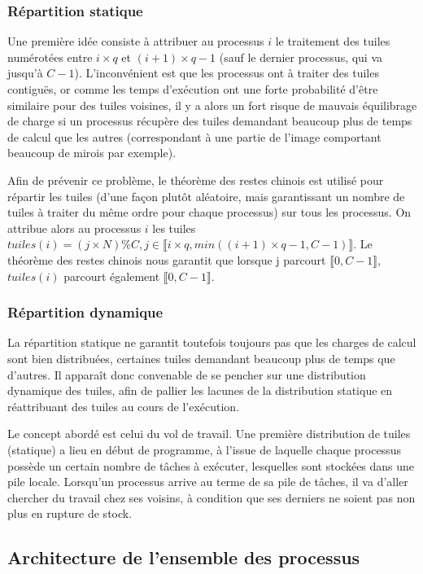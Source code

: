 \subsubsection*{Répartition statique}

Une première idée consiste à attribuer au processus $i$ le traitement des tuiles numérotées entre $i\times q$ et $(i+1)\times q - 1$ (sauf le dernier processus, qui va jusqu'à $C-1$). L'inconvénient est que les processus ont à traiter des tuiles contiguës, or comme les temps d'exécution ont une forte probabilité d'être similaire pour des tuiles voisines, il y a alors un fort risque de mauvais équilibrage de charge si un processus récupère des tuiles demandant beaucoup plus de temps de calcul que les autres (correspondant à une partie de l'image comportant beaucoup de mirois par exemple).

Afin de prévenir ce problème, le théorème des restes chinois est utilisé pour répartir les tuiles (d'une façon plutôt aléatoire, mais garantissant un nombre de tuiles à traiter du même ordre pour chaque processus) sur tous les processus. On attribue alors au processus $i$ les tuiles $tuiles(i) = {(j\times N)\% C, j\in \llbracket i\times q, min((i+1)\times q - 1, C-1)\rrbracket}$. Le théorème des restes chinois nous garantit que lorsque j parcourt $\llbracket 0, C-1\rrbracket$, $tuiles(i)$ parcourt également $\llbracket 0, C-1\rrbracket$.

\subsubsection*{Répartition dynamique}

La répartition statique ne garantit toutefois toujours pas que les charges de calcul sont bien distribuées, certaines tuiles demandant beaucoup plus de temps que d'autres. Il apparaît donc convenable de se pencher sur une distribution dynamique des tuiles, afin de pallier les lacunes de la distribution statique en réattribuant des tuiles au cours de l'exécution.

Le concept abordé est celui du vol de travail. Une première distribution de tuiles (statique) a lieu en début de programme, à l'issue de laquelle chaque processus possède un certain nombre de tâches à exécuter, lesquelles sont stockées dans une pile locale. Lorsqu'un processus arrive au terme de sa pile de tâches, il va d'aller chercher du travail chez ses voisins, à condition que ses derniers ne soient pas non plus en rupture de stock.

\subsection{Architecture de l'ensemble des processus}

